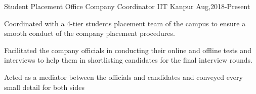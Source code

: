 

\begin{cventries}

  \cventry
  {Student Placement Office}
    {Company Coordinator}
  {IIT Kanpur}
  {Aug,2018-Present}
  {
    \begin{cvitems}
    \item   Coordinated with a 4-tier students placement team of the campus to ensure a smooth conduct of the
            company placement procedures.
    \item   Facilitated the company officials in conducting their online and offline tests and interviews to help them in shortlisting candidates for the final interview rounds.
    \item   Acted as a mediator between the officials and candidates and conveyed every small detail for both sides
    \end{cvitems}
  }
  \cventry
 
\end{cventries}

